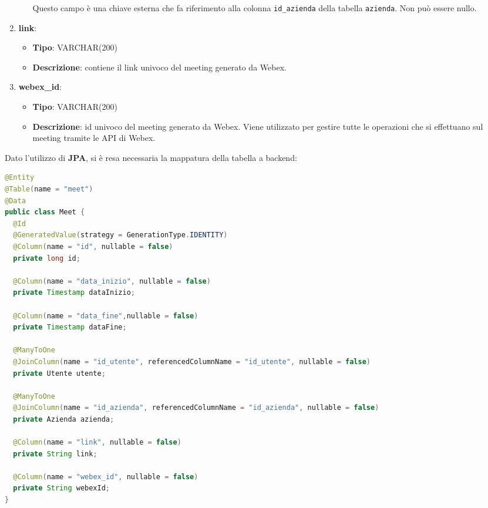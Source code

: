 \begin{enumerate}
\begin{itemize}
            Questo campo è una chiave esterna che fa riferimento alla colonna \texttt{id_azienda} della tabella \texttt{azienda}. 
            Non può essere nullo.
        \end{itemize}
    \item \textbf{link}:
        \begin{itemize}
            \item \textbf{Tipo}: VARCHAR(200)
            \item \textbf{Descrizione}: contiene il link univoco del meeting generato da Webex.
        \end{itemize}
    \item \textbf{webex_id}:
        \begin{itemize}
            \item \textbf{Tipo}: VARCHAR(200)
            \item \textbf{Descrizione}: id univoco del meeting generato da Webex.
            Viene utilizzato per gestire tutte le operazioni che si effettuano sul meeting tramite le API di Webex.
        \end{itemize}
\end{enumerate}
\vspace{20pt}
Dato l'utilizzo di \textbf{JPA}, si è resa necessaria la mappatura della tabella a backend:
\begin{lstlisting}[language=java, frame=lines, basicstyle=\ttfamily\scriptsize]
@Entity
@Table(name = "meet")
@Data
public class Meet {
  @Id
  @GeneratedValue(strategy = GenerationType.IDENTITY)
  @Column(name = "id", nullable = false)
  private long id;
	
  @Column(name = "data_inizio", nullable = false)
  private Timestamp dataInizio;
	
  @Column(name = "data_fine",nullable = false)
  private Timestamp dataFine;
	
  @ManyToOne
  @JoinColumn(name = "id_utente", referencedColumnName = "id_utente", nullable = false)
  private Utente utente;
	
  @ManyToOne
  @JoinColumn(name = "id_azienda", referencedColumnName = "id_azienda", nullable = false)
  private Azienda azienda;
	
  @Column(name = "link", nullable = false)
  private String link;
	
  @Column(name = "webex_id", nullable = false)
  private String webexId;
}
\end{lstlisting}

